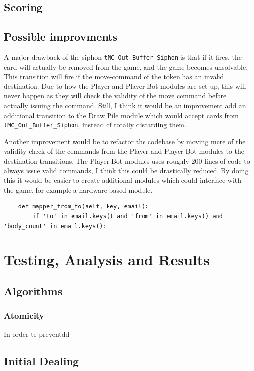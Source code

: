\documentclass[runningheads,a4paper]{llncs}
\begin{document}
\subsection{Scoring}
\subsection{Possible improvments}
A major drawback of the siphon \verb!tMC_Out_Buffer_Siphon! is that if it fires, the card will actually be removed from the game, and the game becomes unsolvable. This transition will fire if the move-command of the token has an invalid destination. Due to how the Player and Player Bot modules are set up, this will never happen as they will check the validity of the move command before actually issuing the command. Still, I think it would be an improvement add an additional transition to the Draw Pile module which would accept cards from \verb!tMC_Out_Buffer_Siphon!, instead of totally discarding them.
\newline

Another improvement would be to refactor the codebase by moving more of the validity check of the commands from the Player and Player Bot modules to the destination transitions. The Player Bot modules uses roughly 200 lines of code to always issue valid commands, I think this could be drastically reduced. By doing this it would be easier to create additional modules which could interface with the game, for example a hardware-based module.

\begin{verbatim}
    def mapper_from_to(self, key, email):
        if 'to' in email.keys() and 'from' in email.keys() and 'body_count' in email.keys():
\end{verbatim}

\section{Testing, Analysis and Results}
\label{sec:3_testing_analysis}
\subsection{Algorithms}
\subsubsection{Atomicity}
In order to preventdd
\subsection{Initial Dealing}
\end{document}
